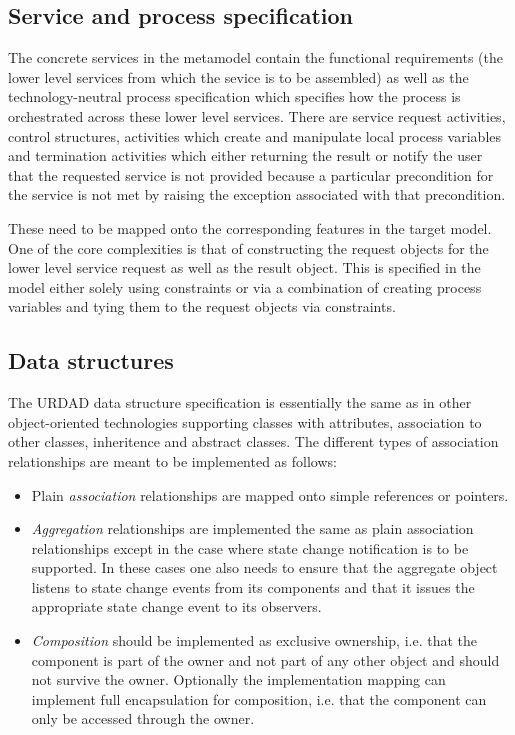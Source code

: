 \subsection{Service and process specification}

The concrete services in the metamodel contain the functional requirements (the lower level services from which the sevice is to be assembled) as well as the technology-neutral process specification which specifies how the process is orchestrated across these lower level services. There are service request activities, control structures, activities which create and manipulate local process variables and termination activities which either returning the result or notify the user that the requested service is not provided because a particular precondition for the service is not met by raising the exception associated with that precondition. 

These need to be mapped onto the corresponding features in the target model. One of the core complexities is that of constructing the request objects for the lower level service request as well as the result object. This is specified in the model either solely using constraints or via a combination of creating process variables and tying them to the request objects via constraints.

\subsection{Data structures}

The URDAD data structure specification is essentially the same as in other object-oriented technologies supporting classes with attributes, association to other classes, inheritence and abstract classes. The different types of association relationships are meant to be implemented as follows:
\begin{itemize}
  \item Plain \textit{association} relationships are mapped onto simple references or pointers.
  \item \textit{Aggregation} relationships are implemented the same as plain association relationships except in the case where state change notification is to be supported. In these cases one also needs to ensure that the aggregate object listens to state change events from its components and that it issues the appropriate state change event to its observers.
  \item \textit{Composition} should be implemented as exclusive ownership, i.e. that the component is part of the owner and not part of any other object and should not survive the owner. Optionally the implementation mapping can implement full encapsulation for composition, i.e. that the component can only be accessed through the owner.
\end{itemize}


